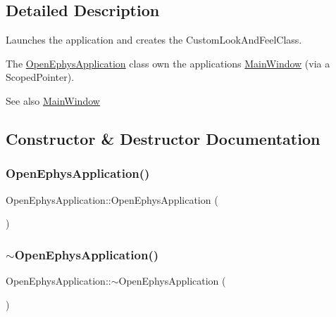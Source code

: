 \subsection{Detailed Description}
Launches the application and creates the Custom\+Look\+And\+Feel\+Class.

The \mbox{\hyperlink{class_open_ephys_application}{Open\+Ephys\+Application}} class own the application\textquotesingle{}s \mbox{\hyperlink{class_main_window}{Main\+Window}} (via a Scoped\+Pointer).

\begin{DoxySeeAlso}{See also}
\mbox{\hyperlink{class_main_window}{Main\+Window}} 
\end{DoxySeeAlso}


\subsection{Constructor \& Destructor Documentation}
\mbox{\label{class_open_ephys_application_a94f33012624a8ec6f5fa3d518027f6fd}} 
\subsubsection{\texorpdfstring{Open\+Ephys\+Application()}{OpenEphysApplication()}}
{\footnotesize\ttfamily Open\+Ephys\+Application\+::\+Open\+Ephys\+Application (\begin{DoxyParamCaption}{ }\end{DoxyParamCaption})\hspace{0.3cm}{\ttfamily [inline]}}

\mbox{\label{class_open_ephys_application_ac6e352344cd7784bf663b4cc89df69a5}} 
\subsubsection{\texorpdfstring{$\sim$\+Open\+Ephys\+Application()}{~OpenEphysApplication()}}
{\footnotesize\ttfamily Open\+Ephys\+Application\+::$\sim$\+Open\+Ephys\+Application (\begin{DoxyParamCaption}{ }\end{DoxyParamCaption})\hspace{0.3cm}{\ttfamily [inline]}}



